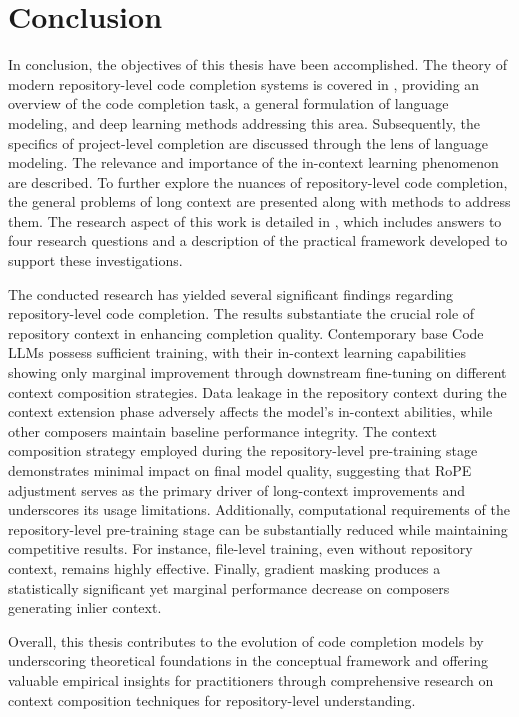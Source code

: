 \chapter*{Conclusion}

In conclusion, the objectives of this thesis have been accomplished. The theory of modern repository-level code completion systems is covered in , providing an overview of the code completion task, a general formulation of language modeling, and deep learning methods addressing this area. Subsequently, the specifics of project-level completion are discussed through the lens of language modeling. The relevance and importance of the in-context learning phenomenon are described. To further explore the nuances of repository-level code completion, the general problems of long context are presented along with methods to address them. The research aspect of this work is detailed in , which includes answers to four research questions and a description of the practical framework developed to support these investigations.

The conducted research has yielded several significant findings regarding repository-level code completion. The results substantiate the crucial role of repository context in enhancing completion quality. Contemporary base Code LLMs possess sufficient training, with their in-context learning capabilities showing only marginal improvement through downstream fine-tuning on different context composition strategies. Data leakage in the repository context during the context extension phase adversely affects the model's in-context abilities, while other composers maintain baseline performance integrity. The context composition strategy employed during the repository-level pre-training stage demonstrates minimal impact on final model quality, suggesting that RoPE adjustment serves as the primary driver of long-context improvements and underscores its usage limitations. Additionally, computational requirements of the repository-level pre-training stage can be substantially reduced while maintaining competitive results. For instance, file-level training, even without repository context, remains highly effective. Finally, gradient masking produces a statistically significant yet marginal performance decrease on composers generating inlier context.

Overall, this thesis contributes to the evolution of code completion models by underscoring theoretical foundations in the conceptual framework and offering valuable empirical insights for practitioners through comprehensive research on context composition techniques for repository-level understanding.
